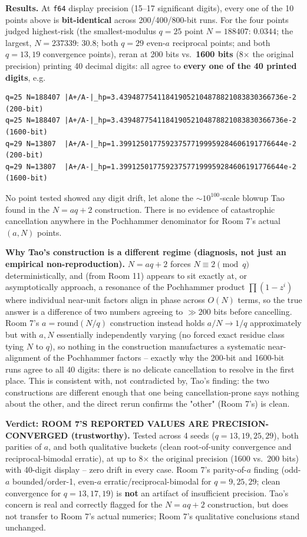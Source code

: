 \textbf{Results.} At \texttt{f64} display precision (15--17 significant digits), every one of
the 10 points above is \textbf{bit-identical} across 200/400/800-bit runs. For the four points
judged highest-risk (the smallest-modulus $q=25$ point $N=188407$: $0.0344$; the largest,
$N=237339$: $30.8$; both $q=29$ even-$a$ reciprocal points; and both $q=13,19$ convergence
points), reran at 200 bits vs.\ \textbf{1600 bits} (8$\times$ the original precision) printing
40 decimal digits: all agree to \textbf{every one of the 40 printed digits}, e.g.
\begin{verbatim}
q=25 N=188407 |A+/A-|_hp=3.439487754118419052104878821083830366736e-2   (200-bit)
q=25 N=188407 |A+/A-|_hp=3.439487754118419052104878821083830366736e-2   (1600-bit)
q=29 N=13807  |A+/A-|_hp=1.399125017759237577199959284606191776644e-2  (200-bit)
q=29 N=13807  |A+/A-|_hp=1.399125017759237577199959284606191776644e-2  (1600-bit)
\end{verbatim}
No point tested showed any digit drift, let alone the $\sim\!10^{100}$-scale blowup Tao found in
the $N=aq+2$ construction. There is no evidence of catastrophic cancellation anywhere in the
Pochhammer denominator for Room 7's actual $(a,N)$ points.

\textbf{Why Tao's construction is a different regime (diagnosis, not just an empirical
non-reproduction).} $N=aq+2$ forces $N\equiv2\pmod q$ deterministically, and (from Room 11)
appears to sit exactly at, or asymptotically approach, a resonance of the Pochhammer product
$\prod(1-z^i)$ where individual near-unit factors align in phase across $O(N)$ terms, so the true
answer is a difference of two numbers agreeing to $\gg200$ bits before cancelling. Room 7's
$a=\mathrm{round}(N/q)$ construction instead holds $a/N\to1/q$ approximately but with $a,N$
essentially independently varying (no forced exact residue class tying $N$ to $q$), so nothing
in the construction manufactures a systematic near-alignment of the Pochhammer factors -- exactly
why the 200-bit and 1600-bit runs agree to all 40 digits: there is no delicate cancellation to
resolve in the first place. This is consistent with, not contradicted by, Tao's finding: the two
constructions are different enough that one being cancellation-prone says nothing about the
other, and the direct rerun confirms the "other" (Room 7's) is clean.

\textbf{Verdict: ROOM 7'S REPORTED VALUES ARE PRECISION-CONVERGED (trustworthy).} Tested across
4 seeds ($q=13,19,25,29$), both parities of $a$, and both qualitative buckets (clean root-of-unity
convergence and reciprocal-bimodal erratic), at up to 8$\times$ the original precision (1600 vs.\
200 bits) with 40-digit display -- zero drift in every case. Room 7's parity-of-$a$ finding
(odd-$a$ bounded/order-1, even-$a$ erratic/reciprocal-bimodal for $q=9,25,29$; clean convergence
for $q=13,17,19$) is \textbf{not} an artifact of insufficient precision. Tao's concern is real
and correctly flagged for the $N=aq+2$ construction, but does not transfer to Room 7's actual
numerics; Room 7's qualitative conclusions stand unchanged.

